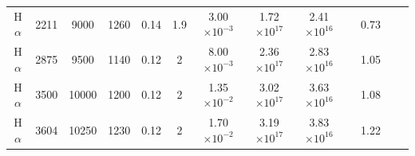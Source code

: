 {\begin{landscape}
\begin{table}
\begin{tabular}{@{} ccccccccccccc @{}}
H$\alpha$ & 2211 & 9000 & 1260&0.14 & 1.9 & 3.00$\times 10^{-3}$ &   1.72$\times 10^{17}$ & 2.41$\times 10^{16}$ & & 0.73 \\

H$\alpha$ & 2875 & 9500 & 1140&0.12 & 2 & 8.00$\times 10^{-3}$ &   2.36$\times 10^{17}$ & 2.83$\times 10^{16}$ & & 1.05  \\

H$\alpha$ & 3500 & 10000 & 1200&0.12 & 2 & 1.35$\times 10^{-2}$  & 3.02$\times 10^{17}$ & 3.63$\times 10^{16}$ && 1.08   \\

H$\alpha$ & 3604 & 10250 & 1230&0.12 & 2 & 1.70$\times 10^{-2}$ &   3.19$\times 10^{17}$ & 3.83$\times 10^{16}$ & & 1.22 \\ 

    \hline
  \end{tabular}

\end{table}


\end{landscape}}
